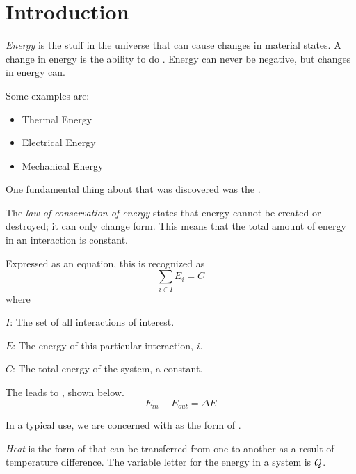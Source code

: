 \section{Introduction}\label{sec:Introduction}
\begin{definition}[Energy]\label{def:Energy}
  \emph{Energy} is the stuff in the universe that can cause changes in material states.
  A change in energy is the ability to do .
  Energy can never be negative, but changes in energy can.

  Some examples are:
  \begin{itemize}[noitemsep]
  \item Thermal Energy
  \item Electrical Energy
  \item Mechanical Energy
  \end{itemize}
\end{definition}

One fundamental thing about  that was discovered was the .
\begin{definition}\label{def:Law_Conservation_Energy}
  The \emph{law of conservation of energy} states that energy cannot be created or destroyed; it can only change form.
  This means that the total amount of energy in an interaction is constant.

  Expressed as an equation, this is recognized as
  \begin{equation}\label{eq:Law_Conservation_Energy}
    \sum_{i \in I} E_{i} = C
  \end{equation}
  where
  \begin{description}[noitemsep]
  \item $I$: The set of all interactions of interest.
  \item $E$: The energy of this particular interaction, $i$.
  \item $C$: The total energy of the system, a constant.
  \end{description}
\end{definition}

The  leads to , shown below.
\begin{equation}\label{eq:Energy_Change}
  E_{in} - E_{out} = \Delta E
\end{equation}

In a typical use, we are concerned with  as the form of .
\begin{definition}[Heat]\label{def:Heat}
  \emph{Heat} is the form of  that can be transferred from one  to another as a result of temperature difference.
  The variable letter for the energy in a system is $Q$.
\end{definition}

